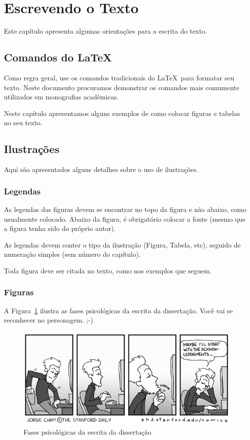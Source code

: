 \documentclass[twoside,english,brazilian]{UNISINOSartigo}
\begin{document}
\section{Escrevendo o Texto}
Este capítulo apresenta algumas orientações para a escrita do texto.

\subsection{Comandos do \LaTeX}
Como regra geral, use os comandos tradicionais do \LaTeX\ para formatar seu texto.  Neste documento procuramos demonstrar os comandos mais comumente utilizados em monografias acadêmicas.

Neste capítulo apresentamos alguns exemplos de como colocar figuras e tabelas no seu texto.

\subsection{Ilustrações}
Aqui são apresentados alguns detalhes sobre o uso de ilustrações.

\subsubsection{Legendas}
As legendas das figuras devem se encontrar no topo da figura e não abaixo, como usualmente colocado. Abaixo da figura, é obrigatório colocar a fonte (mesmo que a figura tenha sido do próprio autor).

As legendas devem conter o tipo da ilustração (Figura, Tabela, etc), seguido de numeração simples (sem número do capítulo).

Toda figura deve ser citada no texto, como nos exemplos que seguem.

\subsubsection{Figuras}
A Figura~\ref{fig:escrita} ilustra as fases psicológicas da escrita da dissertação. Você vai se reconhecer no personagem. ;-)

\begin{figure}
	\caption{Fases psicológicas da escrita da dissertação}
	\label{fig:escrita}
	\centering%
	\begin{minipage}{.8\textwidth}
		\includegraphics[width=\textwidth]{escrita}
	\end{minipage}
\end{figure}
\end{document}
